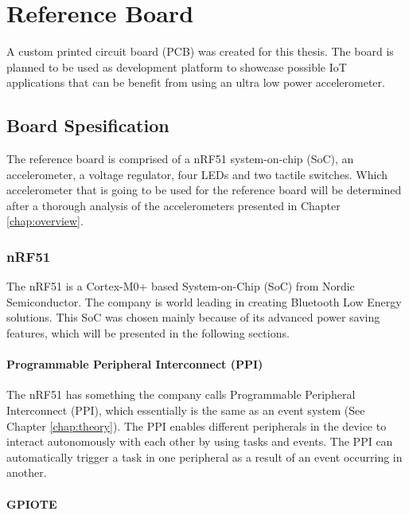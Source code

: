 \chapter{Reference Board}
\label{chap:reference}

A custom printed circuit board (PCB) was created for this thesis. The board is planned to be used as development platform to showcase possible IoT applications that can be benefit from using an ultra low power accelerometer. 

\section{Board Spesification}

The reference board is comprised of a nRF51 system-on-chip (SoC), an accelerometer, a voltage regulator, four LEDs and two tactile switches. Which accelerometer that is going to be used for the reference board will be determined after a thorough analysis of the accelerometers presented in Chapter \ref{chap:overview}.


\subsection{nRF51}

The nRF51 is a Cortex-M0+ based System-on-Chip (SoC) from Nordic Semiconductor. The company is world leading in creating Bluetooth Low Energy solutions. This SoC was chosen mainly because of its advanced power saving features, which will be presented in the following sections. 

\subsubsection{Programmable Peripheral Interconnect (PPI)}

The nRF51 has something the company calls Programmable Peripheral Interconnect (PPI), which essentially is the same as an event system (See Chapter \ref{chap:theory}). The PPI enables different peripherals in the device to interact autonomously with each other by using tasks and events. The PPI can automatically trigger a task in one peripheral as a result of an event occurring in another. 

\subsubsection{GPIOTE}

